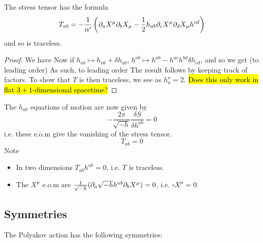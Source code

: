 \documentclass{article}
\begin{document}
\begin{lemma}
	The stress tensor has the formula 
\[
T_{ab} = -\frac{1}{\alpha^\prime} \left( \partial_a X^\mu \partial_b X_\mu - \frac{1}{2}h_{ab} \partial_c X^\mu \partial_d X_\mu h^{cd} \right) 
\]
and so is traceless. 
\end{lemma}
\begin{proof}
We have 
Now if $h_{ab}\mapsto h_{ab}+\delta h_{ab}$, $h^{ab} \mapsto h^{ab}-h^{ac}h^{bd}\delta h_{cd}$, and so we get (to leading order)
As such, to leading order 
The result follows by keeping track of factors. To show that $T$ is then traceless, we see 
as $h^a_a = 2$. \hl{Does this only work in flat $3+1$-dimensional spacetime?}
\end{proof}
The $h_{ab}$ equations of motion are now given by
\[
-\frac{2\pi}{\sqrt{-h}} \frac{\delta S}{\delta h^{ab}} = 0
\]
i.e. these e.o.m give the vanishing of the stress tensor. 
\[
T_{ab}= 0 
\]
Note
\begin{itemize}
    \item In two dimensions $T_{ab}h^{ab}=0$, i.e. $T$ is traceless.
    \item The $X^\mu$ e.o.m are $\frac{1}{\sqrt{-h}} ( \partial_a \sqrt{-h} h^{ab} \partial_b X^\mu ) =0 $, i.e. $\square X^\mu = 0$.
\end{itemize}

\subsection{Symmetries}
The Polyakov action has the following symmetries: 
\end{document}
